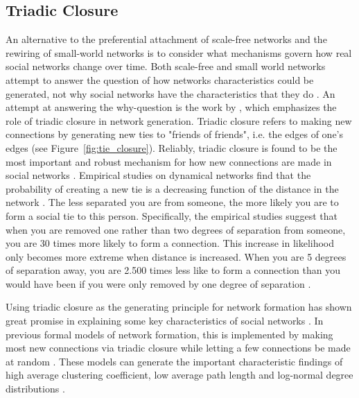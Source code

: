 \documentclass[11pt]{article}
\begin{document}
\subsection{Triadic Closure}
An alternative to the preferential attachment of scale-free networks and the rewiring of small-world networks is to consider what mechanisms govern how real social networks change over time. Both scale-free and small world networks attempt to answer the question of how networks characteristics could be generated, not why social networks have the characteristics that they do \cite{jackson_search_2004}. An attempt at answering the why-question is the work by , which emphasizes the role of triadic closure in network generation. Triadic closure refers to making new connections by generating new ties to "friends of friends", i.e. the edges of one's edges (see Figure~\ref{fig:tie_closure}). Reliably, triadic closure is found to be the most important and robust mechanism for how new connections are made in social networks \cite{asikainen_cumulative_2020,bianconi_triadic_2014,kossinets_origins_2009,peixoto_disentangling_2022}. Empirical studies on dynamical networks find that the probability of creating a new tie is a decreasing function of the distance in the network \cite{bener_empirical_2016,kossinets_origins_2009}. The less separated you are from someone, the more likely you are to form a social tie to this person. Specifically, the empirical studies suggest that when you are removed one rather than two degrees of separation from someone, you are 30 times more likely to form a connection. This increase in likelihood only becomes more extreme when distance is increased. When you are 5 degrees of separation away, you are 2.500 times less like to form a connection than you would have been if you were only removed by one degree of separation \cite{kossinets_origins_2009}. 

Using triadic closure as the generating principle for network formation has shown great promise in explaining some key characteristics of social networks \cite{ilany_social_2016}. In previous formal models of network formation, this is implemented by making most new connections via triadic closure while letting a few connections be made at random \cite{ilany_social_2016,jackson_search_2004,jackson_meeting_2007}. These models can generate the important characteristic findings of high average clustering coefficient, low average path length and log-normal degree distributions \cite{jackson_search_2004,jackson_meeting_2007}. 
\end{document}
